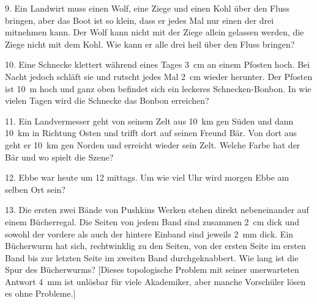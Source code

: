 \begin{problem}{9.}
	Ein Landwirt muss einen Wolf, eine Ziege und einen Kohl über den Fluss bringen, aber das Boot ist so klein, dass er jedes Mal nur einen der drei mitnehmen kann. Der Wolf kann nicht mit der Ziege allein gelassen werden, die Ziege nicht mit dem Kohl. Wie kann er alle drei heil über den Fluss bringen?
\end{problem}

\begin{problem}{10.}
	Eine Schnecke klettert während eines Tages \SI{3}{\cm} an einem Pfosten hoch. Bei Nacht jedoch schläft sie und rutscht jedes Mal \SI{2}{\cm} wieder herunter. Der Pfosten ist \SI{10}{\metre} hoch und ganz oben befindet sich ein leckeres Schnecken-Bonbon. In wie vielen Tagen wird die Schnecke das Bonbon erreichen?
\end{problem}

\begin{problem}{11.}
	Ein Landvermesser geht von seinem Zelt aus \SI{10}{\km} gen Süden und dann \SI{10}{\km} in Richtung Osten und trifft dort auf seinen Freund Bär. Von dort aus geht er \SI{10}{\km} gen Norden und erreicht wieder sein Zelt. Welche Farbe hat der Bär und wo spielt die Szene?
\end{problem}

\begin{problem}{12.}
	Ebbe war heute um \SI{12}{\uhr} mittags. Um wie viel Uhr wird morgen Ebbe am selben Ort sein?
\end{problem}

\begin{problem}{13.}
	Die ersten zwei Bände von Pushkins Werken stehen direkt nebeneinander auf einem Bücherregal. Die Seiten von jedem Band sind zusammen \SI{2}{\cm} dick und sowohl der vordere als auch der hintere Einband sind jeweils \SI{2}{\mm} dick. Ein Bücherwurm hat sich, rechtwinklig zu den Seiten, von der ersten Seite im ersten Band bis zur letzten Seite im zweiten Band durchgeknabbert. Wie lang ist die Spur des Bücherwurms? [Dieses topologische Problem mit seiner unerwarteten Antwort \SI{4}{\mm} ist unlösbar für viele Akademiker, aber manche Vorschüler lösen es ohne Probleme.]
\end{problem}

